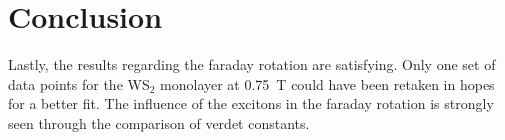 \newpage
\section{Conclusion}

  Lastly, the results regarding the faraday rotation are satisfying. Only one set of data points for the WS$_2$ monolayer at \SI{0.75}{\tesla} could have been retaken in hopes for a better fit.
  The influence of the excitons in the faraday rotation is strongly seen through the comparison of verdet constants.
